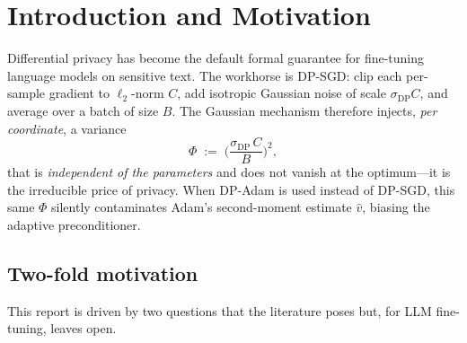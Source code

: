 \documentclass[11pt]{article}
\theoremstyle{plain}
\theoremstyle{definition}
\theoremstyle{remark}
\begin{document}
\begin{abstract}
reduction cannot help---which is precisely why correlated-noise mechanisms that provably help
\emph{from-scratch} SGD do not transfer to LLM DP-LoRA fine-tuning. Beyond the reference, we
contribute (i)~the $\rho$ diagnostic, (ii)~the $\hat m/\hat v$ mechanism, (iii)~a four-control
attribution of DP-AdamBC, (iv)~a verified privacy-sensitivity correction
$\kappa=\sqrt{(1-\lambda^{2T})/(1-\lambda^2)}$ for $w_t=z_t-\lambda z_{t-1}$ (the naive $\sqrt{1+\lambda^2}$
\emph{breaks} privacy), and (v)~the signal-ceiling theorem for first-moment denoising---none of
which appear in DP-AdamBC. \emph{Honesty markers:} the E2E utility is a teacher-forced proxy BLEU,
and the positive-method sweeps are single-seed (consistent across five variants).
\end{abstract}

\section{Introduction and Motivation}
\label{sec:intro}

Differential privacy \citep{abadi2016deepdp,mironov2017renyi} has become the default formal
guarantee for fine-tuning language models on sensitive text. The workhorse is DP-SGD: clip each
per-sample gradient to $\ell_2$-norm $C$, add isotropic Gaussian noise of scale
$\sigma_{\mathrm{DP}}C$, and average over a batch of size $B$. The Gaussian mechanism therefore
injects, \emph{per coordinate}, a variance
\begin{equation}
\label{eq:phi-intro}
\Phi \;:=\; \Big(\frac{\sigma_{\mathrm{DP}}\,C}{B}\Big)^2,
\end{equation}
that is \emph{independent of the parameters} and does not vanish at the optimum---it is the
irreducible price of privacy. When DP-Adam is used instead of DP-SGD, this same $\Phi$ silently
contaminates Adam's second-moment estimate $\hat v$, biasing the adaptive preconditioner.

\subsection*{Two-fold motivation}

This report is driven by two questions that the literature poses but, for LLM fine-tuning, leaves
open.
\end{document}
